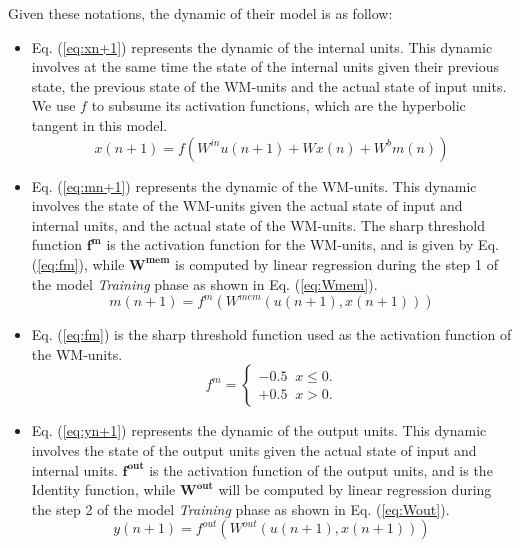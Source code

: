 Given these notations, the dynamic of their model is as follow:
\begin{itemize}
    \item Eq. (\ref{eq:xn+1}) represents the dynamic of the internal units. This dynamic involves at the same time the state of the internal units given their previous state, the previous state of the WM-units and the actual state of input units. We use $\mathbf{}{f}$ to subsume its activation functions, which are the hyperbolic tangent in this model.
    \begin{equation} \label{eq:xn+1}
        x(n+1) = f(W^{in}u(n+1) + Wx(n) + W^{b}m(n))
    \end{equation}

    \item Eq. (\ref{eq:mn+1}) represents the dynamic of the WM-units. This dynamic involves the state of the WM-units given the actual state of input and internal units, and the actual state of the WM-units. The sharp threshold function $\mathbf{f^{m}}$ is the activation function for the WM-units, and is given by Eq. (\ref{eq:fm}), while $\mathbf{W^{mem}}$ is computed by linear regression during the step 1 of the model \textit{Training} phase as shown in Eq. (\ref{eq:Wmem}).
    \begin{equation} \label{eq:mn+1}
        m(n+1) = f^{m}(W^{mem}(u(n+1), x(n+1)))
    \end{equation}

    \item Eq. (\ref{eq:fm}) is the sharp threshold function used as the activation function of the WM-units.
    \begin{equation} \label{eq:fm}
        f^{m} = \begin{cases}
            -0.5 \; \; x\leq 0. \\
            +0.5 \; \; x>0. \end{cases}
    \end{equation}

    \item Eq. (\ref{eq:yn+1}) represents the dynamic of the output units. This dynamic involves the state of the output units given the actual state of input and internal units. $\mathbf{f^{out}}$ is the activation function of the output units, and is the Identity function, while $\mathbf{W^{out}}$ will be computed by linear regression during the step 2 of the model \textit{Training} phase as shown in Eq. (\ref{eq:Wout}).
    \begin{equation} \label{eq:yn+1}
        y(n+1) = f^{out}(W^{out}(u(n+1), x(n+1)))
    \end{equation}


\end{itemize}
